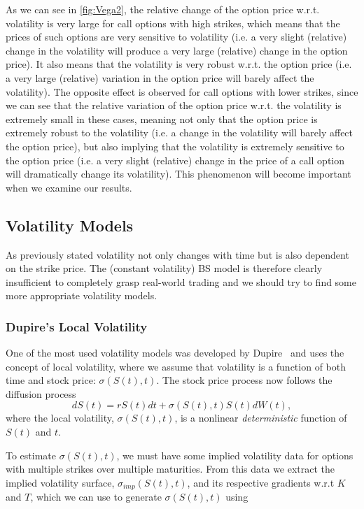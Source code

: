 As we can see in \autoref{fig:Vega2}, the relative change of the option price w.r.t. volatility is very large for call options with high strikes, which means that the prices of such options are very sensitive to volatility (i.e. a very slight (relative) change in the volatility will produce a very large (relative) change in the option price). It also means that the volatility is very robust w.r.t. the option price (i.e. a very large (relative) variation in the option price will barely affect the volatility).
The opposite effect is observed for call options with lower strikes, since we can see that the relative variation of the option price w.r.t. the volatility is extremely small in these cases, meaning not only that the option price is extremely robust to the volatility (i.e. a change in the volatility will barely affect the option price), but also implying that the volatility is extremely sensitive to the option price (i.e. a very slight (relative) change in the price of a call option will dramatically change its volatility).
This phenomenon will become important when we examine our results.

\subsection{Volatility Models}
As previously stated volatility not only changes with time but is also dependent on the strike price.
The (constant volatility) BS model is therefore clearly insufficient to completely grasp real-world trading and we should try to find some more appropriate volatility models.

\vspace{5pt}
\subsubsection{Dupire's Local Volatility}
One of the most used volatility models was developed by Dupire~\citep{Dupire} and uses the concept of local volatility, where we assume that volatility is a function of both time and stock price: $\sigma(S(t),t)$.
The stock price process now follows the diffusion process
\begin{equation}\label{GBM2}
dS(t)=rS(t)dt+\sigma(S(t),t)S(t)dW(t),
\end{equation}
\noindent where the local volatility, $\sigma(S(t),t)$, is a nonlinear \emph{deterministic} function of $S(t)$ and $t$.

To estimate $\sigma(S(t),t)$, we must have some implied volatility data for options with multiple strikes over multiple maturities. From this data we extract the implied volatility surface, $\sigma_{imp}(S(t),t)$, and its respective gradients w.r.t $K$ and $T$, which we can use to generate $\sigma(S(t),t)$ using

